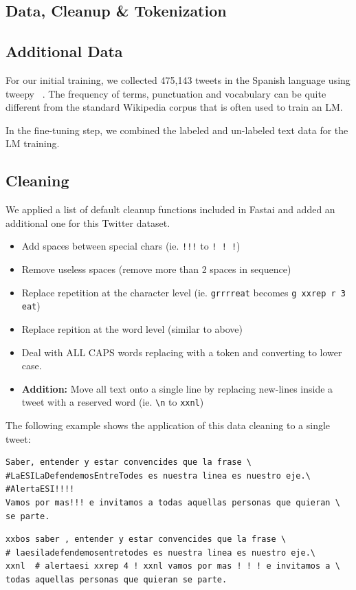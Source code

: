 \documentclass[smallextended]{svjour3}       %
\begin{document}
\subsection{Data, Cleanup \& Tokenization}
\label{sec:datacleaning}
\subsection{Additional Data}
For our initial training, we  collected 475,143 tweets in the Spanish language using tweepy ~\cite{Tweepy}.  The frequency of terms, punctuation and vocabulary can be quite different from the standard Wikipedia corpus that is often used to train an LM.

In the fine-tuning step, we combined the labeled and un-labeled text data for the LM training.
\subsection{Cleaning}
We applied a list of default cleanup functions included in Fastai\cite{} and added an additional one for this Twitter dataset.
\begin{itemize}
	\item Add spaces between special chars (ie. \verb|!!!| to \verb|! ! !|)
	\item Remove useless spaces (remove more than 2 spaces in sequence)
	\item Replace repetition at the character level (ie. \verb|grrrreat| becomes \verb|g xxrep r 3 eat|)
	\item Replace repition at the word level (similar to above)
	\item Deal with ALL CAPS words replacing with a token and converting to lower case.
	\item \textbf{Addition:} Move all text onto a single line by replacing new-lines inside a tweet with a reserved word (ie. \verb|\n| to \verb|xxnl|)
\end{itemize} 
The following example shows the application of this data cleaning to a single tweet:
\begin{verbatim} 
Saber, entender y estar convencides que la frase \
#LaESILaDefendemosEntreTodes es nuestra linea es nuestro eje.\
#AlertaESI!!!!
Vamos por mas!!! e invitamos a todas aquellas personas que quieran \
se parte.
\end{verbatim}

\begin{verbatim} 
xxbos saber , entender y estar convencides que la frase \
# laesiladefendemosentretodes es nuestra linea es nuestro eje.\
xxnl  # alertaesi xxrep 4 ! xxnl vamos por mas ! ! ! e invitamos a \
todas aquellas personas que quieran se parte.
\end{verbatim}
\end{document}
